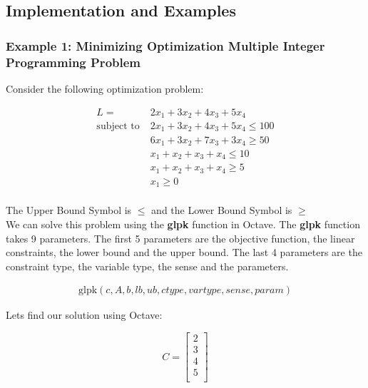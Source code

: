 \subsection{Implementation and Examples}

\subsubsection{Example 1: Minimizing Optimization Multiple Integer Programming Problem}

Consider the following optimization problem:

\begin{equation}
\begin{aligned}
    L = & \; 2x_1 + 3x_2 + 4x_3 + 5x_4 \\
    \text{subject to} & \; 2x_1 + 3x_2 + 4x_3 + 5x_4 \leq 100 \\
    & \; 6x_1 + 3x_2 + 7x_3 + 3x_4 \geq 50 \\
    & \; x_1 + x_2 + x_3 + x_4 \leq 10 \\
    & \; x_1 + x_2 + x_3 + x_4 \geq 5 \\
    & \; x_1 \geq 0 \\
\end{aligned}
\end{equation}

The Upper Bound Symbol is \(\leq\) and the Lower Bound Symbol is \(\geq\) \\

We can solve this problem using the \textbf{glpk} function in Octave. The \textbf{glpk} function takes 9 parameters. The first 5 parameters are the objective function, the linear constraints, the lower bound and the upper bound. The last 4 parameters are the constraint type, the variable type, the sense and the parameters.

\begin{equation}
\begin{aligned}
    \text{glpk} (c, A, b, lb, ub, ctype, vartype, sense, param)
\end{aligned}
\end{equation}

Lets find our solution using Octave:

\begin{equation}
C =
    \begin{bmatrix}
        2 \\
        3 \\
        4 \\
        5 \\
    \end{bmatrix}
\end{equation}

